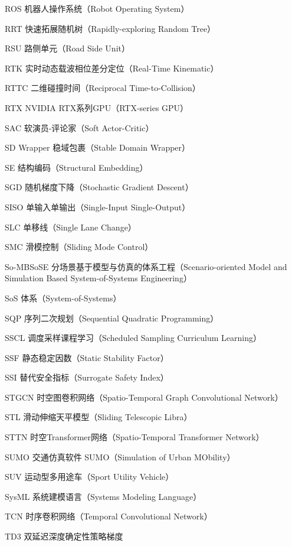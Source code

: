 \begin{denotation}[3cm]
  \item[ROS] 机器人操作系统（Robot Operating System）
  \item[RRT] 快速拓展随机树（Rapidly-exploring Random Tree）
  \item[RSU] 路侧单元（Road Side Unit）
  \item[RTK] 实时动态载波相位差分定位（Real-Time Kinematic）
  \item[RTTC] 二维碰撞时间（Reciprocal Time-to-Collision）
  \item[RTX] NVIDIA RTX系列GPU（RTX-series GPU）
  \item[SAC] 软演员-评论家（Soft Actor-Critic）
  \item[SD Wrapper] 稳域包裹（Stable Domain Wrapper）
  \item[SE] 结构编码（Structural Embedding）
  \item[SGD] 随机梯度下降（Stochastic Gradient Descent）
  \item[SISO] 单输入单输出（Single-Input Single-Output）
  \item[SLC] 单移线（Single Lane Change）
  \item[SMC] 滑模控制（Sliding Mode Control）
  \item[So-MBSoSE] 分场景基于模型与仿真的体系工程（Scenario-oriented Model and Simulation Based System-of-Systems Engineering）
  \item[SoS] 体系（System-of-Systems）
  \item[SQP] 序列二次规划（Sequential Quadratic Programming）
  \item[SSCL] 调度采样课程学习（Scheduled Sampling Curriculum Learning）
  \item[SSF] 静态稳定因数（Static Stability Factor）
  \item[SSI] 替代安全指标（Surrogate Safety Index）
  \item[STGCN] 时空图卷积网络（Spatio-Temporal Graph Convolutional Network）
  \item[STL] 滑动伸缩天平模型（Sliding Telescopic Libra）
  \item[STTN] 时空Transformer网络（Spatio-Temporal Transformer Network）
  \item[SUMO] 交通仿真软件 SUMO（Simulation of Urban MObility）
  \item[SUV] 运动型多用途车（Sport Utility Vehicle）
  \item[SysML] 系统建模语言（Systems Modeling Language）
  \item[TCN] 时序卷积网络（Temporal Convolutional Network）
  \item[TD3] 双延迟深度确定性策略梯度

\end{denotation}

